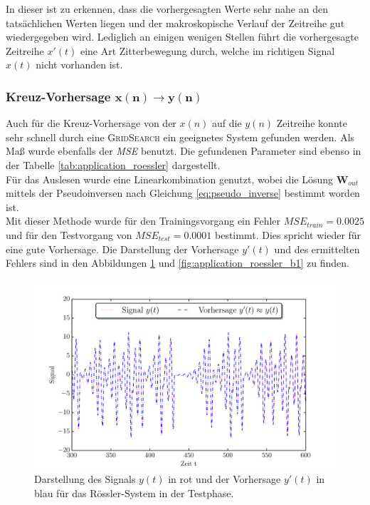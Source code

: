 In dieser ist zu erkennen, dass die vorhergesagten Werte sehr nahe an den tatsächlichen Werten liegen und der makroskopische Verlauf der Zeitreihe gut wiedergegeben wird. Lediglich an einigen wenigen Stellen führt die vorhergesagte Zeitreihe $x'(t)$ eine Art Zitterbewegung durch, welche im richtigen Signal $x(t)$ nicht vorhanden ist.


\subsubsection[Kreuz-Vorhersage $x(n) \rightarrow y(n)$]{Kreuz-Vorhersage $\pmb{x(n) \rightarrow y(n)}$}
Auch für die Kreuz-Vorhersage von der $x(n)$ auf die $y(n)$ Zeitreihe konnte sehr schnell durch eine \textsc{GridSearch} ein geeignetes System gefunden werden. Als Maß wurde ebenfalls der \textit{MSE} benutzt. Die gefundenen Parameter sind ebenso in der Tabelle \ref{tab:application_roessler} dargestellt.\\
Für das Auslesen wurde eine Linearkombination genutzt, wobei die Lösung $\mathbf{W}_{out}$ mittels der Pseudoinversen nach Gleichung \ref{eq:pseudo_inverse} bestimmt worden ist.\\

Mit dieser Methode wurde für den Trainingsvorgang ein Fehler $MSE_{train} = 0.0025$ und für den Testvorgang von $MSE_{test} = 0.0001$ bestimmt. Dies spricht wieder für eine gute Vorhersage. Die Darstellung der Vorhersage $y'(t)$ und des ermittelten Fehlers sind in den Abbildungen \ref{fig:application_roessler_b2} und \ref{fig:application_roessler_b1} zu finden.

\begin{figure}[H]
    \centering
     \includegraphics[width = 0.9 \textwidth]{figures/roessler_cross_pred.pdf}
      \caption{Darstellung des Signals $y(t)$ in rot und der Vorhersage $y'(t)$ in blau für das Rössler-System in der Testphase.}
    \label{fig:application_roessler_b2}
\end{figure}


